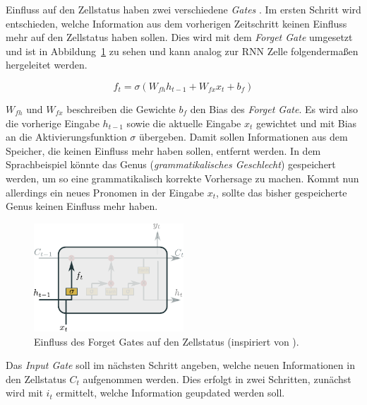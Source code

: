                 Einfluss auf den Zellstatus haben zwei verschiedene \textit{Gates} .
            Im ersten Schritt wird entschieden, welche Information aus dem vorherigen Zeitschritt keinen Einfluss mehr auf den Zellstatus haben sollen.
            Dies wird mit dem \textit{Forget Gate} umgesetzt und ist in Abbildung~\ref{fig:LSTM_Forget} zu sehen und kann analog zur RNN Zelle folgendermaßen hergeleitet werden.

            \begin{equation}
                f_t = \sigma\left(W_{fh}h_{t-1} + W_{fx}x_t + b_f\right)
            \end{equation}

            $W_{fh}$ und $W_{fx}$ beschreiben die Gewichte $b_f$ den Bias des \textit{Forget Gate}.
            Es wird also die vorherige Eingabe $h_{t-1}$ sowie die aktuelle Eingabe $x_t$ gewichtet und mit Bias an die Aktivierungsfunktion $\sigma$ übergeben.
            Damit sollen Informationen aus dem Speicher, die keinen Einfluss mehr haben sollen, entfernt werden.
            In dem Sprachbeispiel könnte das Genus (\textit{grammatikalisches Geschlecht}) gespeichert werden, um so eine grammatikalisch korrekte Vorhersage zu machen.
            Kommt nun allerdings ein neues Pronomen in der Eingabe $x_t$, sollte das bisher gespeicherte Genus keinen Einfluss mehr haben.
            
                \begin{figure}[ht]
                    \centering
                    \includegraphics[width=0.5\textwidth]{images/Illustrationen/LSTM_FG}
                    \caption{Einfluss des Forget Gates auf den Zellstatus (inspiriert von \cite{OLAH2015}).}
                    \label{fig:LSTM_Forget}
                \end{figure}
                
            Das \textit{Input Gate} soll im nächsten Schritt angeben, welche neuen Informationen in den Zellstatus $C_t$ aufgenommen werden.
            Dies erfolgt in zwei Schritten, zunächst wird mit $i_t$ ermittelt, welche Information geupdated werden soll.

